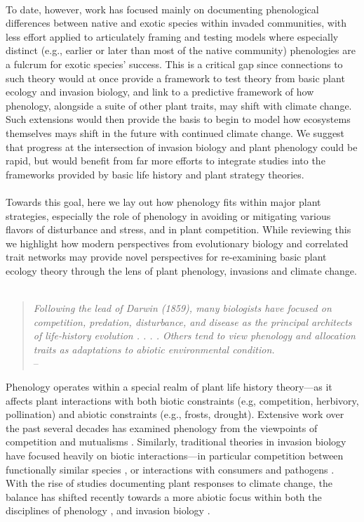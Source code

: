 \documentclass[11pt,a4paper,oneside]{article}
\begin{document}
\\
To date, however, work has focused mainly on documenting phenological differences between native and exotic species within invaded communities, with less effort applied to articulately framing and testing models where especially distinct (e.g., earlier or later than most of the native community) phenologies are a fulcrum for exotic species' success. This is a critical gap since connections to such theory would at once provide a framework to test theory from basic plant ecology and invasion biology, and link to a predictive framework of how phenology, alongside a suite of other plant traits, may shift with climate change. Such extensions would then provide the basis to begin to model how ecosystems themselves mays shift in the future with continued climate change. We suggest that progress at the intersection of invasion biology and plant phenology could be rapid, but would benefit from far more efforts to integrate studies into the frameworks provided by basic life history and plant strategy theories.\\
\\
Towards this goal, here we lay out how phenology fits within major plant strategies, especially the role of phenology in avoiding or mitigating various flavors of disturbance and stress, and in plant competition. While reviewing this we highlight how modern perspectives from evolutionary biology and correlated trait networks may provide novel perspectives for re-examining basic plant ecology theory through the lens of plant phenology, invasions and climate change. \\
\\
\begin{quote} 
\emph{Following the lead of Darwin (1859), many
biologists have focused on competition, predation, disturbance,
and disease as the principal architects of life-history
evolution . . . . Others
tend to view phenology and allocation traits as adaptations
to abiotic environmental condition.} \\
-- \cite{stanton2000}
\end{quote}
Phenology operates within a special realm of plant life history theory---as it affects plant interactions with both biotic constraints (e.g, competition, herbivory, pollination) and abiotic constraints (e.g., frosts, drought). Extensive work over the past several decades has examined phenology from the viewpoints of competition \citep[e.g.,][]{Rathcke:1988yc,VANSCHAIK:1993uq} and mutualisms \citep[e.g.,][]{Brody:1997ro}. Similarly, traditional theories in invasion biology have focused heavily on biotic interactions---in particular competition between functionally similar species \citep[limiting similarity and competitive exclusion,][]{macarthur1967,abrams1983}, or interactions with consumers and pathogens \citep[enemy release,][]{Keane:2002uz,Liu:2006kj}. With the rise of studies documenting plant responses to climate change, the balance has shifted recently towards a more abiotic focus within both the disciplines of phenology \citep[e.g.,][]{Inouye:2008gj,Miller-Rushing:2008zv}, and invasion biology \citep{sorte2013}.\\
\end{document}
